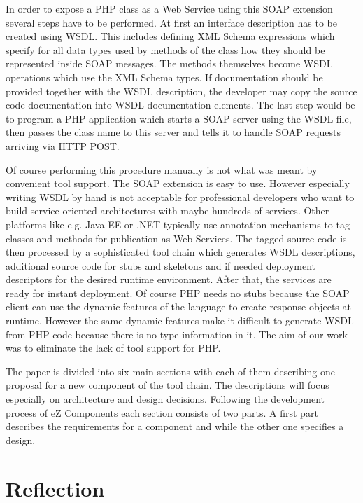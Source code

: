 \documentclass[10pt,final,a4paper,oneside]{article}
\begin{document}
In order to expose a PHP class as a Web Service using this SOAP extension
several steps have to be performed.
At first an interface description has to be created using WSDL. This includes
defining XML Schema expressions \cite{XMLSchema} which specify for all data types
used by methods of the class how they should be represented inside SOAP messages.
The methods themselves become WSDL operations which use the XML Schema types.
If documentation should be provided together with the WSDL description,
the developer may copy the source code documentation into
WSDL documentation elements.
The last step would be to program a PHP application which starts a SOAP server
using the WSDL file, then passes the class name to this server and tells it to
handle SOAP requests arriving via HTTP POST.

Of course performing this procedure manually is not what was meant by
convenient tool support.
The SOAP extension is easy to use. However especially writing WSDL by hand is not
acceptable for professional developers who want to build service-oriented
architectures with maybe hundreds of services. Other platforms like e.g.
Java EE or .NET typically use annotation mechanisms to tag classes and methods
for publication as Web Services. The tagged source code is then processed by a
sophisticated tool chain which generates WSDL descriptions, additional source code
for stubs and skeletons and if needed deployment descriptors for the desired
runtime environment.
After that, the services are ready for instant deployment.
Of course PHP needs no stubs because the SOAP client can use the dynamic
features of the language to create response objects at runtime.
However the same dynamic features make it difficult to generate WSDL from PHP
code because there is no type information in it.
The aim of our work was to eliminate the lack of tool support for PHP.

The paper is divided into six main sections
with each of them describing one proposal
for a new component of the tool chain.
The descriptions will focus especially on architecture and design decisions.
Following the development process of eZ Components each section consists of two parts.
A first part describes the requirements for a component and while the other one
specifies a design.



\section{Reflection}\label{sec:Reflection}
%
\end{document}
